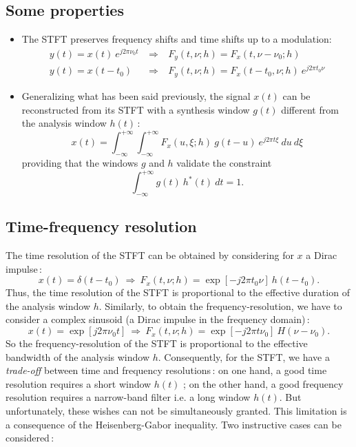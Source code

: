 \subsection{Some properties}
\begin{itemize}
\item The STFT preserves frequency shifts and time shifts up to a modulation:
\begin{eqnarray*}
y(t) = x(t)\ e^{j2\pi \nu_0 t} &\ \Rightarrow\ & F_y(t,\nu;h)=F_x(t,\nu-\nu_0;h)\\ 
y(t) = x(t-t_0) &\ \Rightarrow\ & F_y(t,\nu;h)=F_x(t-t_0,\nu;h)\ e^{j2\pi t_0 \nu}  
\end{eqnarray*}
     
\item Generalizing what has been said previously, the signal $x(t)$ can be
reconstructed from its STFT with a synthesis window $g(t)$ different from the
analysis window $h(t)$\,:
\[x(t)=\int_{-\infty}^{+\infty} \int_{-\infty}^{+\infty} F_x(u,\xi;h)\
g(t-u)\ e^{j2\pi t \xi}\ du\ d\xi\] 
providing that the windows $g$ and $h$ validate the constraint 
\[\int_{-\infty}^{+\infty} g(t)\ h^*(t)\ dt =1.\]
\end{itemize}

\subsection{Time-frequency resolution}
 The time resolution of the STFT can be obtained by considering for $x$ a
Dirac impulse\,:
\[x(t)=\delta(t-t_0) \ \Rightarrow\  F_x(t,\nu;h)=\exp{[-j2\pi t_0 \nu]}
\ h(t-t_0).\]  
Thus, the time resolution of the STFT is proportional to the effective
duration of the analysis window $h$. Similarly, to obtain the
frequency-resolution, we have to consider a complex sinusoid (a Dirac
impulse in the frequency domain)\,:
\[x(t)=\exp{[j2\pi \nu_0 t]} \ \Rightarrow\  F_x(t,\nu;h)=\exp{[-j2\pi t
\nu_0]}\ H(\nu-\nu_0).\] So the frequency-resolution of the STFT is
proportional to the effective bandwidth of the analysis window
$h$. Consequently, for the STFT, we have a {\it trade-off} between time and
frequency resolutions\,: on one hand, a good time resolution requires a
short window $h(t)$ ; on the other hand, a good frequency resolution
requires a narrow-band filter i.e. a long window $h(t)$. But unfortunately,
these wishes can not be simultaneously granted. This limitation is a
consequence of the Heisenberg-Gabor inequality. Two instructive cases can
be considered\,:
  
